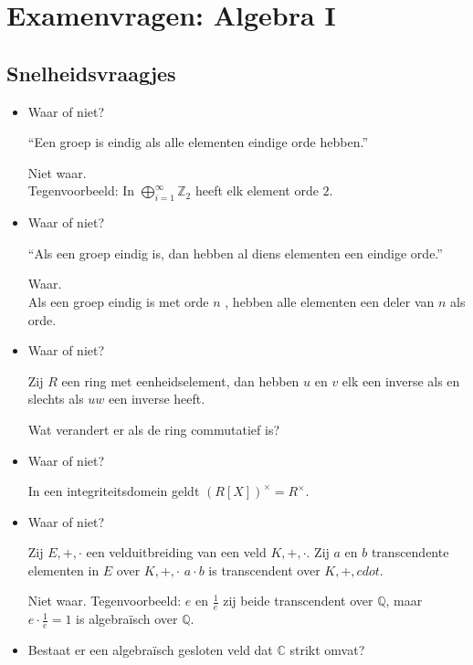 \documentclass[main.tex]{subfiles}
\begin{document}
\chapter{Examenvragen: Algebra I}
\label{cha:examen-a}

\section{Snelheidsvraagjes}
\label{sec:snelheidsvraagjes}

\begin{itemize}
\item Waar of niet?
  \begin{center}
    ``Een groep is eindig als alle elementen eindige orde hebben.''
  \end{center}

  Niet waar.\\
  Tegenvoorbeeld: In $\bigoplus_{i=1}^{\infty}\mathbb{Z}_{2}$ heeft elk element orde $2$.
\item Waar of niet?
  \begin{center}
    ``Als een groep eindig is, dan hebben al diens elementen een eindige orde.''
  \end{center}
  Waar.\\
  Als een groep eindig is met orde $n$ , hebben alle elementen een deler van $n$ als orde.
\item Waar of niet?
  \begin{center}
    Zij $R$ een ring met eenheidselement, dan hebben $u$ en $v$ elk een inverse als en slechts als $uw$ een inverse heeft.
  \end{center}
  Wat verandert er als de ring commutatief is?
\item Waar of niet?
  \begin{center}
    In een integriteitsdomein geldt $(R[X])^{\times} = R^{\times}$.
  \end{center}
\item Waar of niet?
  \begin{center}
    Zij $E,+,\cdot$ een velduitbreiding van een veld $K,+,\cdot$. 
    Zij $a$ en $b$ transcendente elementen in $E$ over $K,+,\cdot$
    $a\cdot b$ is transcendent over $K,+,cdot$.
  \end{center}
  Niet waar. Tegenvoorbeeld: $e$ en $\frac{1}{e}$ zij beide transcendent over $\mathbb{Q}$, maar $e \cdot \frac{1}{e}=1$ is algebra\"isch over $\mathbb{Q}$.
\item Bestaat er een algebra\"isch gesloten veld dat $\mathbb{C}$ strikt omvat?

\end{itemize}
\end{document}
